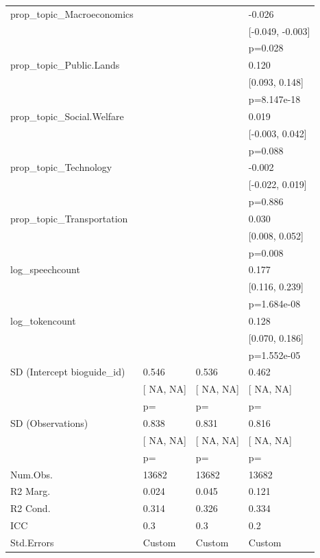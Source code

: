 \begin{tabular}{llll}
prop_topic_Macroeconomics &  &  & -0.026 \\
&  &  & [-0.049, -0.003] \\
&  &  & p=0.028 \\
prop_topic_Public.Lands &  &  & 0.120 \\
&  &  & [0.093, 0.148] \\
&  &  & p=8.147e-18 \\
prop_topic_Social.Welfare &  &  & 0.019 \\
&  &  & [-0.003, 0.042] \\
&  &  & p=0.088 \\
prop_topic_Technology &  &  & -0.002 \\
&  &  & [-0.022, 0.019] \\
&  &  & p=0.886 \\
prop_topic_Transportation &  &  & 0.030 \\
&  &  & [0.008, 0.052] \\
&  &  & p=0.008 \\
log_speechcount &  &  & 0.177 \\
&  &  & [0.116, 0.239] \\
&  &  & p=1.684e-08 \\
log_tokencount &  &  & 0.128 \\
&  &  & [0.070, 0.186] \\
&  &  & p=1.552e-05 \\
SD (Intercept bioguide_id) & 0.546 & 0.536 & 0.462 \\
& [  NA,   NA] & [  NA,   NA] & [  NA,   NA] \\
& p= & p= & p= \\
SD (Observations) & 0.838 & 0.831 & 0.816 \\
& [  NA,   NA] & [  NA,   NA] & [  NA,   NA] \\
& p= & p= & p= \\
Num.Obs. & 13682 & 13682 & 13682 \\
R2 Marg. & 0.024 & 0.045 & 0.121 \\
R2 Cond. & 0.314 & 0.326 & 0.334 \\
ICC & 0.3 & 0.3 & 0.2 \\
Std.Errors & Custom & Custom & Custom \\
\hline
\end{tabular}
